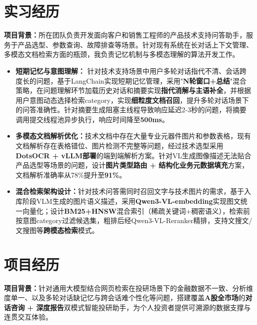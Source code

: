\section{实习经历}
\textbf{项目背景：}所在团队负责开发面向客户和销售工程师的产品技术支持问答助手，服务于产品选型、参数查询、故障排查等场景。针对现有系统在长对话上下文管理、多模态文档检索方面的瓶颈，我负责记忆机制与多模态理解的算法开发工作。
\begin{itemize}
  \item \textbf{短期记忆与意图理解：} 针对技术支持场景中用户多轮对话指代不清、会话跨度长的问题，基于LangChain实现短期记忆管理，采用"\textbf{N轮窗口+总结}"混合策略，在问题理解环节加载历史对话和摘要实现\textbf{指代消解与主语补全}，并根据用户意图动态选择检索category，实现\textbf{细粒度文档召回}，提升多轮对话场景下的问答准确性。针对摘要生成阻塞主线程导致响应延迟2-3秒的问题，将摘要调用提交线程池异步执行，响应时间降至\textbf{500ms}。
  \item \textbf{多模态文档解析优化：}技术文档中存在大量专业元器件图片和参数表格，现有文档解析存在表格错位、图片检测不完整等问题，经过技术选型采用\textbf{DotsOCR + vLLM部署}的端到端解析方案。针对VL生成图像描述无法贴合产品选型等场景的问题，设计\textbf{图片类型路由 + 结构化业务元数据填充}方案，文档解析准确率从78\%提升至\textbf{91\%}。
  \item \textbf{混合检索架构设计：}针对技术问答需同时召回文字与技术图片的需求，基于入库阶段VLM生成的图片语义描述，采用\textbf{Qwen3-VL-embedding}实现图文统一向量化；设计\textbf{BM25+HNSW}混合索引（稀疏关键词+稠密语义），检索前按意图category过滤候选集，粗排后经Qwen3-VL-Reranker精排，支持文搜文/文搜图等\textbf{跨模态检索}模式。
\end{itemize}

\section{项目经历}
\textbf{项目背景：}针对通用大模型结合网页检索在投研场景下的金融数据不一致、分析维度单一、以及多轮对话缺记忆与跨会话难个性化等问题，搭建覆盖\textbf{A股全市场}的\textbf{对话咨询 + 深度报告}双模式智能投研助手，为个人投资者提供可溯源的数据支撑与连贯交互体验。

